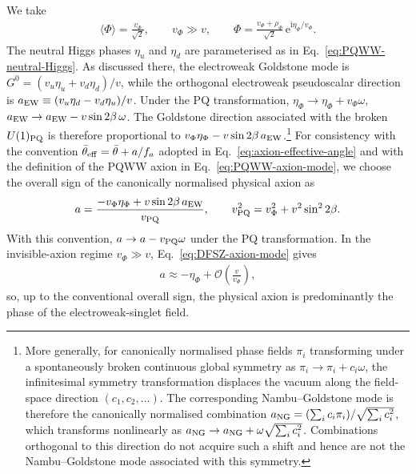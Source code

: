 \documentclass[review]{elsarticle}
\numberwithin{equation}{section}
\numberwithin{table}{section}
\numberwithin{figure}{section}
\def\i{\mathrm{i}}
\def\e{\mathrm{e}}
\begin{document}
We take
\begin{align}
    \langle\Phi\rangle = \frac{v_\Phi}{\sqrt{2}},
    \qquad
    v_\Phi\gg v,
    \qquad
    \Phi = \frac{v_\Phi+\rho_\Phi}{\sqrt{2}}\,\e^{\i\eta_\Phi/v_\Phi}.
    \label{eq:DFSZ-singlet-vev}
\end{align}
The neutral Higgs phases $\eta_u$ and $\eta_d$ are parameterised as in Eq.~\eqref{eq:PQWW-neutral-Higgs}. As discussed there, the electroweak Goldstone mode is
$G^0=(v_u\eta_u+v_d\eta_d)/v$, while the orthogonal electroweak pseudoscalar direction is $a_{\rm EW} \equiv (v_u\eta_d-v_d\eta_u)/v$. Under the PQ transformation, $\eta_\Phi \rightarrow \eta_\Phi+v_\Phi\omega$, $a_{\rm EW}\rightarrow a_{\rm EW}-v\sin2\beta\,\omega $.
The Goldstone direction associated with the broken $U(1)_{\rm PQ}$ is therefore proportional to
$v_\Phi\eta_\Phi-v\sin2\beta\,a_{\rm EW}$.\footnote{More generally, for canonically normalised phase fields $\pi_i$ transforming under a spontaneously broken continuous global symmetry as $\pi_i\rightarrow\pi_i+c_i\omega$, the infinitesimal symmetry transformation displaces the vacuum along the field-space direction $(c_1,c_2,\ldots)$. The corresponding Nambu--Goldstone mode is therefore the canonically normalised combination $a_{\rm NG}=(\sum_i c_i\pi_i)/\sqrt{\sum_i c_i^2}$, which transforms nonlinearly as $a_{\rm NG}\rightarrow a_{\rm NG}+\omega\sqrt{\sum_i c_i^2}$. Combinations orthogonal to this direction do not acquire such a shift and hence are not the Nambu--Goldstone mode associated with this symmetry.} For consistency with the convention
$\bar\theta_{\rm eff}=\bar\theta+a/f_a$ adopted in Eq.~\eqref{eq:axion-effective-angle} and with the definition of the PQWW axion in Eq.~\eqref{eq:PQWW-axion-mode}, we choose the overall sign of the canonically normalised physical axion as
\begin{align}
    a = \frac{-v_\Phi\eta_\Phi+v\sin2\beta\,a_{\rm EW}}{v_{\rm PQ}},
    \qquad
    v_{\rm PQ}^2 = v_\Phi^2 + v^2\sin^22\beta .
    \label{eq:DFSZ-axion-mode}
\end{align}
With this convention, $a\rightarrow a-v_{\rm PQ}\omega$ under the PQ transformation. In the invisible-axion regime $v_\Phi\gg v$, Eq.~\eqref{eq:DFSZ-axion-mode} gives
\begin{align}
    a \approx -\eta_\Phi + \mathcal{O}\left(\frac{v}{v_\Phi}\right),
    \label{eq:DFSZ-singlet-dominated}
\end{align}
so, up to the conventional overall sign, the physical axion is predominantly the phase of the electroweak-singlet field.
\end{document}
